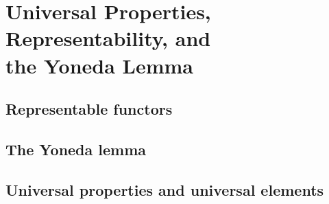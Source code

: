 \chapter[Universal Properties, Representability, and the Yoneda Lemma]{Universal Properties, \\ Representability, and \\ the Yoneda Lemma}

\section{Representable functors}






\section{The Yoneda lemma}








\section{Universal properties and universal elements}




